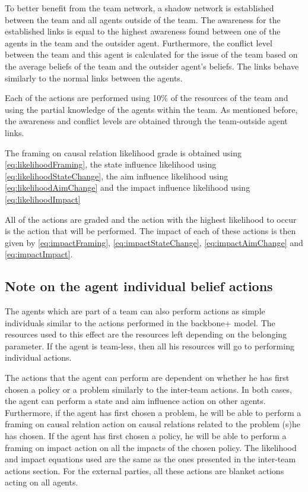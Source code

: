 \begin{itemize}
To better benefit from the team network, a shadow network is established between the team and all agents outside of the team. The awareness for the established links is equal to the highest awareness found between one of the agents in the team and the outsider agent. Furthermore, the conflict level between the team and this agent is calculated for the issue of the team based on the average beliefs of the team and the outsider agent's beliefs. The links behave similarly to the normal links between the agents.

Each of the actions are performed using 10\% of the resources of the team and using the partial knowledge of the agents within the team. As mentioned before, the awareness and conflict levels are obtained through the team-outside agent links.


The framing on causal relation likelihood grade is obtained using \autoref{eq:likelihoodFraming}, the state influence likelihood using \autoref{eq:likelihoodStateChange}, the aim influence likelihood using \autoref{eq:likelihoodAimChange} and the impact influence likelihood using \autoref{eq:likelihoodImpact}

All of the actions are graded and the action with the highest likelihood to occur is the action that will be performed. The impact of each of these actions is then given by \autoref{eq:impactFraming}, \autoref{eq:impactStateChange}, \autoref{eq:impactAimChange} and \autoref{eq:impactImpact}.

\end{itemize}

\subsection{Note on the agent individual belief actions}

The agents which are part of a team can also perform actions as simple individuals similar to the actions performed in the backbone+ model. The resources used to this effect are the resources left depending on the belonging parameter. If the agent is team-less, then all his resources will go to performing individual actions.


The actions that the agent can perform are dependent on whether he has first chosen a policy or a problem similarly to the inter-team actions. In both cases, the agent can perform a state and aim influence action on other agents. Furthermore, if the agent has first chosen a problem, he will be able to perform a framing on causal relation action on causal relations related to the problem (s)he has chosen. If the agent has first chosen a policy, he will be able to perform a framing on impact action on all the impacts of the chosen policy. The likelihood and impact equations used are the same as the ones presented in the inter-team actions section. For the external parties, all these actions are blanket actions acting on all agents. 


